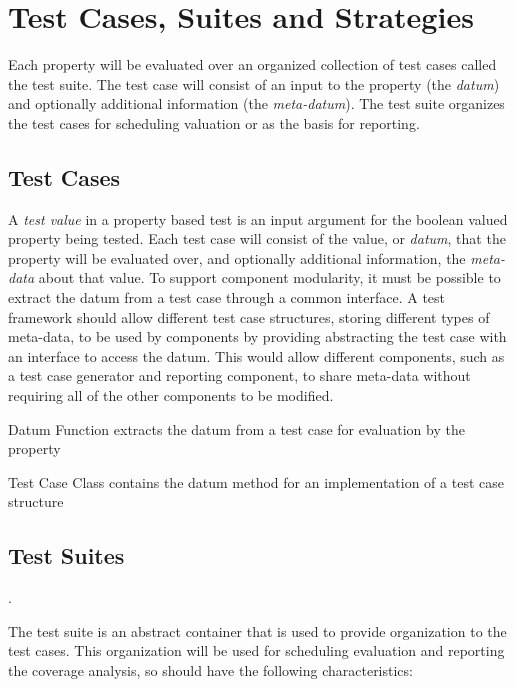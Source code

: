 \section{Test Cases, Suites and Strategies}

Each property will be evaluated over an organized collection of test cases called the test suite.
The test case will consist of an input to the property (the \emph{datum})
and optionally additional information (the \emph{meta-datum}).
The test suite organizes the test cases for scheduling valuation
or as the basis for reporting.

\subsection{Test Cases}

A \emph{test value} in a property based test is an input argument
for the boolean valued property being tested.
Each test case will consist of the value, or \emph{datum}, 
that the property will be evaluated over,
and optionally additional information, the \emph{meta-data} about that value.
To support component modularity, 
it must be possible to extract the datum from a test case
through a common interface.
A test framework should allow different test case structures,
storing different types of meta-data,
to be used by components by providing abstracting the test case with an interface to access the datum.
This would allow different components,
such as a test case generator and reporting component,
to share meta-data without requiring all of the other components to be modified.

\begin{definition}
\item[Datum Function] extracts the datum from a test case for evaluation by the property
\item[Test Case Class] contains the datum method for an implementation of a test case structure
\end{definition}


\subsection{Test Suites}\label{sub:test suites}.

The test suite is an abstract container that is used to
provide organization to the test cases.
This organization will be used for scheduling evaluation
and reporting the coverage analysis,
so should have the following characteristics:

